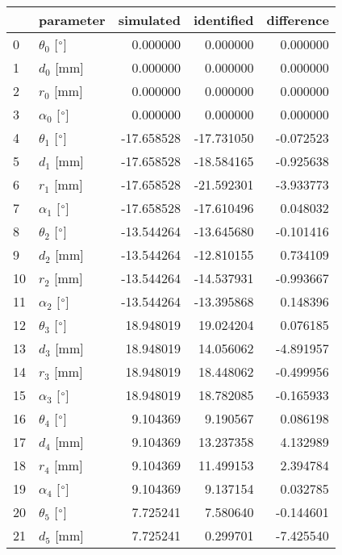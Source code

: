 \documentclass{standalone}%
\begin{document}
%
\normalsize%
\begin{tabular}{llrrr}
\toprule
{} &                 parameter &  simulated & identified & difference \\
\midrule
0  &  $\theta_{0}$ [$\degree$] &   0.000000 &   0.000000 &   0.000000 \\
1  &              $d_{0}$ [mm] &   0.000000 &   0.000000 &   0.000000 \\
2  &              $r_{0}$ [mm] &   0.000000 &   0.000000 &   0.000000 \\
3  &  $\alpha_{0}$ [$\degree$] &   0.000000 &   0.000000 &   0.000000 \\
4  &  $\theta_{1}$ [$\degree$] & -17.658528 & -17.731050 &  -0.072523 \\
5  &              $d_{1}$ [mm] & -17.658528 & -18.584165 &  -0.925638 \\
6  &              $r_{1}$ [mm] & -17.658528 & -21.592301 &  -3.933773 \\
7  &  $\alpha_{1}$ [$\degree$] & -17.658528 & -17.610496 &   0.048032 \\
8  &  $\theta_{2}$ [$\degree$] & -13.544264 & -13.645680 &  -0.101416 \\
9  &              $d_{2}$ [mm] & -13.544264 & -12.810155 &   0.734109 \\
10 &              $r_{2}$ [mm] & -13.544264 & -14.537931 &  -0.993667 \\
11 &  $\alpha_{2}$ [$\degree$] & -13.544264 & -13.395868 &   0.148396 \\
12 &  $\theta_{3}$ [$\degree$] &  18.948019 &  19.024204 &   0.076185 \\
13 &              $d_{3}$ [mm] &  18.948019 &  14.056062 &  -4.891957 \\
14 &              $r_{3}$ [mm] &  18.948019 &  18.448062 &  -0.499956 \\
15 &  $\alpha_{3}$ [$\degree$] &  18.948019 &  18.782085 &  -0.165933 \\
16 &  $\theta_{4}$ [$\degree$] &   9.104369 &   9.190567 &   0.086198 \\
17 &              $d_{4}$ [mm] &   9.104369 &  13.237358 &   4.132989 \\
18 &              $r_{4}$ [mm] &   9.104369 &  11.499153 &   2.394784 \\
19 &  $\alpha_{4}$ [$\degree$] &   9.104369 &   9.137154 &   0.032785 \\
20 &  $\theta_{5}$ [$\degree$] &   7.725241 &   7.580640 &  -0.144601 \\
21 &              $d_{5}$ [mm] &   7.725241 &   0.299701 &  -7.425540 \\

\end{tabular}
\end{document}
